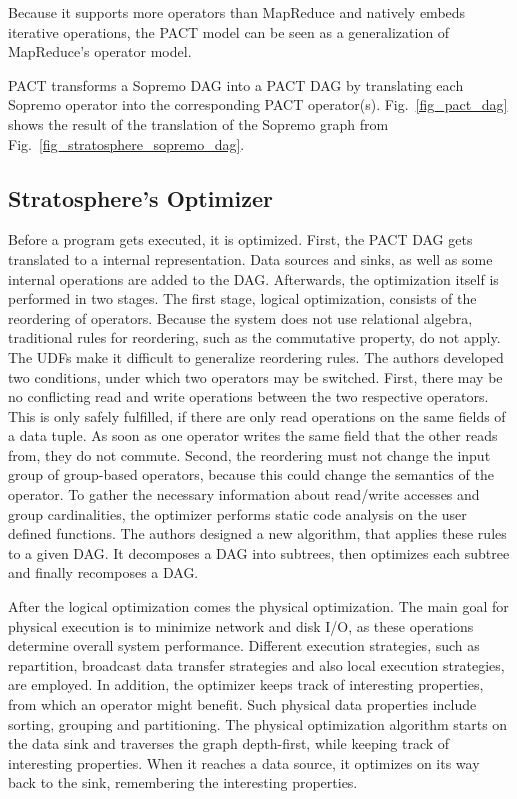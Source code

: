 Because it supports more operators than MapReduce and natively embeds iterative operations, the PACT model can be seen as a generalization of MapReduce's operator model.

PACT transforms a Sopremo DAG into a PACT DAG by translating each Sopremo operator into the corresponding PACT operator(s). Fig.~\ref{fig_pact_dag} shows the result of the translation of the Sopremo graph from Fig.~\ref{fig_stratosphere_sopremo_dag}.

\subsection{Stratosphere's Optimizer}\label{straotsphereOptimizer}
Before a program gets executed, it is optimized. First, the PACT DAG gets translated to a internal representation. Data sources and sinks, as well as some internal operations are added to the DAG. Afterwards, the optimization itself is performed in two stages. The first stage, logical optimization, consists of the reordering of operators. Because the system does not use relational algebra, traditional rules for reordering, such as the commutative property, do not apply. The UDFs make it difficult to generalize reordering rules. The authors developed two conditions, under which two operators may be switched. First, there may be no conflicting read and write operations between the two respective operators. This is only safely fulfilled, if there are only read operations on the same fields of a data tuple. As soon as one operator writes the same field that the other reads from, they do not commute. Second, the reordering must not change the input group of group-based operators, because this could change the semantics of the operator. To gather the necessary information about read/write accesses and group cardinalities, the optimizer performs static code analysis on the user defined functions. The authors designed a new algorithm, that applies these rules to a given DAG. It decomposes a DAG into subtrees, then optimizes each subtree and finally recomposes a DAG.

After the logical optimization comes the physical optimization. The main goal for physical execution is to minimize network and disk I/O, as these operations determine overall system performance. Different execution strategies, such as repartition, broadcast data transfer strategies and also local execution strategies, are employed. In addition, the optimizer keeps track of interesting properties, from which an operator might benefit. Such physical data properties include sorting, grouping and partitioning. The physical optimization algorithm starts on the data sink and traverses the graph depth-first, while keeping track of interesting properties. When it reaches a data source, it optimizes on its way back to the sink, remembering the interesting properties.

